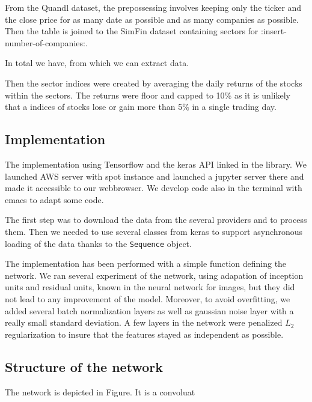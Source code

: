 \documentclass[a4paper,twoside]{article}
\begin{document}
From the Quandl dataset, the prepossessing involves keeping only the ticker
and the close price for as many date as possible and as many companies as
possible. Then the table is joined to the SimFin dataset containing sectors
for :insert-number-of-companies:.

In total we have, from which we can extract data.

Then the sector indices were created by averaging the daily returns of the
stocks within the sectors. The returns were floor and capped to 10\% as it is
unlikely that a indices of stocks lose or gain more than 5\% in a single
trading day.

\subsection{Implementation}
\label{sec:org90ba10c}

The implementation using Tensorflow and the keras API linked in the library.
We launched AWS server with spot instance and launched a jupyter server there
and made it accessible to our webbrowser. We develop code also in the
terminal with emacs to adapt some code.

The first step was to download the data from the several providers and to
process them. Then we needed to use several classes from keras to support
asynchronous loading of the data thanks to the \texttt{Sequence} object.

The implementation has been performed with a simple function defining the
network. We ran several experiment of the network, using adapation of
inception units and residual units, known in the neural network for images,
but they did not lead to any improvement of the model. Moreover, to avoid
overfitting, we added several batch normalization layers as well as gaussian
noise layer with a really small standard deviation. A few layers in the
network were penalized \(L_2\) regularization to insure that the features
stayed as independent as possible.


\subsection{Structure of the network}
\label{sec:org8dd4226}

The network is depicted in Figure. It is a convoluat
\end{document}
